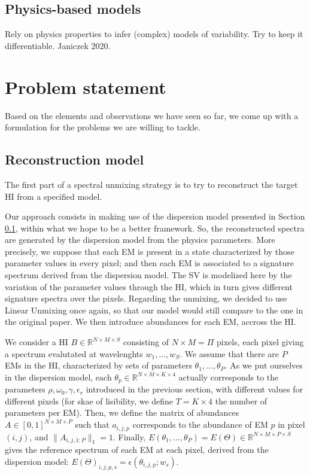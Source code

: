 \documentclass[conference]{IEEEtran}
\begin{document}
\subsection{Physics-based models}\label{sec:dispersion}
Rely on physics properties to infer (complex) models of variability. Try to keep it differentiable. Janiczek 2020.


\section{Problem statement}
Based on the elements and observations we have seen so far, we come up with a formulation for the problems we are willing to tackle.

\subsection{Reconstruction model}
The first part of a spectral unmixing strategy is to try to reconstruct the target HI from a specified model.

Our approach consists in making use of the dispersion model presented in Section \ref{sec:dispersion}, within what we hope to be a better framework. So, the reconstructed spectra are generated by the dispersion model from the physics parameters. More precisely, we suppose that each EM is present in a state characterized by those parameter values in every pixel; and then each EM is associated to a signature spectrum derived from the dispersion model. The SV is modelized here by the variation of the parameter values through the HI, which in turn gives different signature spectra over the pixels. Regarding the unmixing, we decided to use Linear Unmixing once again, so that our model would still compare to the one in the original paper. We then introduce abundances for each EM, accross the HI.

We consider a HI $B \in \mathbb{R}^{N \times M \times S}$ consisting of $N \times M = \Pi$ pixels, each pixel giving a spectrum evalutated at wavelenghts $w_1,\dots, w_S$. We assume that there are $P$ EMs in the HI, characterized by sets of parameters $\theta_1,\dots, \theta_P$. As we put ourselves in the dispersion model, each $\theta_p \in \mathbb{R}^{N \times M \times K \times 4}$ actually corresponds to the parameters $\rho, \omega_0, \gamma, \epsilon_r$ introduced in the previous section, with different values for different pixels (for skae of lisibility, we define $T = K \times 4$ the number of parameters per EM). Then, we define the matrix of abundances $A \in [0, 1]^{N \times M\times P}$ such that $a_{i, j, p}$ corresponds to the abundance of EM $p$ in pixel $(i, j)$, and $\|A_{i, j, 1:P}\|_1 = 1$. Finally, $E(\theta_1,\dots, \theta_P) = E(\Theta) \in \mathbb{R}^{N \times M \times P \times S}$ gives the reference spectrum of each EM at each pixel, derived from the dispersion model: $E(\Theta)_{i, j, p, s} = \epsilon(\theta_{i, j, p}; w_s)$.
\end{document}
